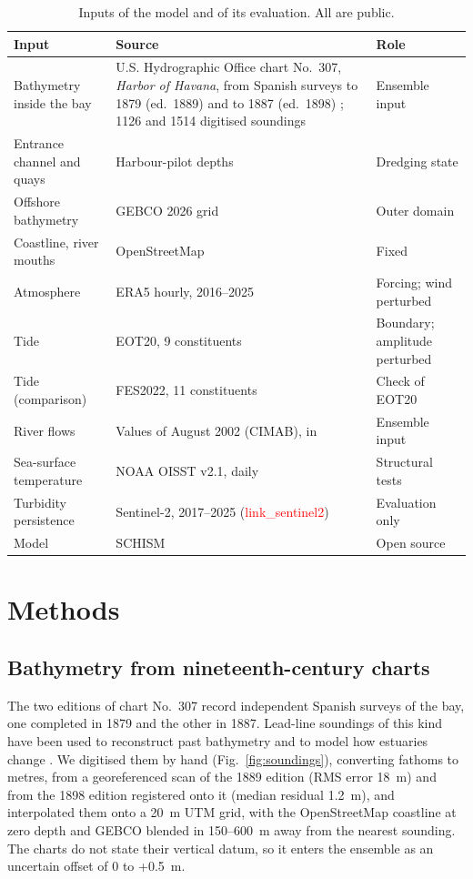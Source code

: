 \documentclass[a4paper,fleqn]{ems-dc}
\newcommand{\ph}[1]{\textcolor{red}{\textsf{#1}}}
\begin{document}
\begin{table}[!t]
\centering\small
\caption{Inputs of the model and of its evaluation. All are public.}\label{tab:data}
\begin{tabular}{p{3.0cm}p{9.8cm}p{4.0cm}}
\toprule
Input & Source & Role\\
\midrule
Bathymetry inside the bay & U.S. Hydrographic Office chart No.~307, \emph{Harbor of
Havana}, from Spanish surveys to 1879 (ed.~1889) and to 1887 (ed.~1898)
\citep{USHO1889,USHO1898}; 1126 and 1514 digitised soundings & Ensemble input\\
Entrance channel and quays & Harbour-pilot depths \citep{Practicos2018} & Dredging state\\
Offshore bathymetry & GEBCO 2026 grid \citep{GEBCO2026} & Outer domain\\
Coastline, river mouths & OpenStreetMap \citep{OSM} & Fixed\\
Atmosphere & ERA5 hourly, 2016--2025 \citep{Hersbach2020} & Forcing; wind perturbed\\
Tide & EOT20, 9 constituents \citep{HartDavis2021} & Boundary; amplitude perturbed\\
Tide (comparison) & FES2022, 11 constituents \citep{FES2022,Lyard2026} & Check of EOT20\\
River flows & Values of August 2002 (CIMAB), in \citet{JICA2004} & Ensemble input\\
Sea-surface temperature & NOAA OISST v2.1, daily \citep{Huang2021} & Structural tests\\
Turbidity persistence & Sentinel-2, 2017--2025 (\ph{link\_sentinel2}) & Evaluation only\\
Model & SCHISM \citep{Zhang2016} & Open source\\
\bottomrule
\end{tabular}
\end{table}

\section{Methods}\label{sec:methods}
\subsection{Bathymetry from nineteenth-century charts}\label{sec:bathy}
The two editions of chart No.~307 record independent Spanish surveys of the bay, one
completed in 1879 and the other in 1887. Lead-line soundings of this kind have been used to
reconstruct past bathymetry and to model how estuaries change
\citep{Jaffe2007,Ralston2019,Poirier2020}. We digitised them by hand
(Fig.~\ref{fig:soundings}), converting fathoms to metres, from a georeferenced scan of the
1889 edition (RMS error 18~m) and from the 1898 edition registered onto it (median residual
1.2~m), and interpolated them onto a 20~m UTM grid, with the OpenStreetMap coastline at zero
depth and GEBCO blended in 150--600~m away from the nearest sounding. The charts do not state
their vertical datum, so it enters the ensemble as an uncertain offset of 0 to +0.5~m.
\end{document}

